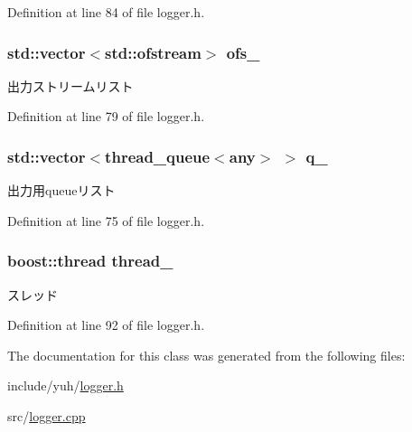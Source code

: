 \-Definition at line 84 of file logger.\-h.

\hypertarget{classyuh_1_1detail_1_1logger_a281aed45a8c2b369a0e5965cdb00c273}{
\subsubsection[{ofs\-\_\-}]{\setlength{\rightskip}{0pt plus 5cm}std\-::vector$<$std\-::ofstream$>$ {\bf ofs\-\_\-}}}\label{d1/dce/classyuh_1_1detail_1_1logger_a281aed45a8c2b369a0e5965cdb00c273}
出力ストリームリスト 

\-Definition at line 79 of file logger.\-h.

\hypertarget{classyuh_1_1detail_1_1logger_af2b7d7f50e13fa5e21ae7dbaaaf56d81}{
\subsubsection[{q\-\_\-}]{\setlength{\rightskip}{0pt plus 5cm}std\-::vector$<${\bf thread\-\_\-queue}$<${\bf any}$>$ $>$ {\bf q\-\_\-}}}\label{d1/dce/classyuh_1_1detail_1_1logger_af2b7d7f50e13fa5e21ae7dbaaaf56d81}
出力用queueリスト 

\-Definition at line 75 of file logger.\-h.

\hypertarget{classyuh_1_1detail_1_1logger_a813cb749320df26fae57fc171a765178}{
\subsubsection[{thread\-\_\-}]{\setlength{\rightskip}{0pt plus 5cm}boost\-::thread {\bf thread\-\_\-}}}\label{d1/dce/classyuh_1_1detail_1_1logger_a813cb749320df26fae57fc171a765178}
スレッド 

\-Definition at line 92 of file logger.\-h.



\-The documentation for this class was generated from the following files\-:\begin{DoxyCompactItemize}
\item 
include/yuh/\hyperlink{logger_8h}{logger.\-h}\item 
src/\hyperlink{logger_8cpp}{logger.\-cpp}\end{DoxyCompactItemize}
